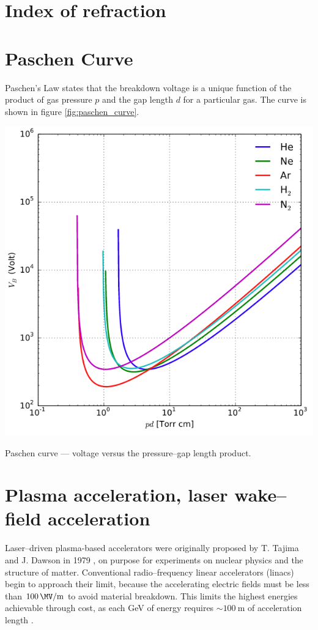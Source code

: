 \documentclass[justified,nofonts,nobib,openany]{tufte-book}
\begin{document}
\section{Index of refraction}\label{sec:indexrefraction}


\section{Paschen Curve}\label{sec:paschen}
Paschen's Law states that the breakdown voltage is a unique function of the product of gas pressure $p$ and the gap length $d$ for a particular gas. The curve is shown in figure \ref{fig:paschen_curve}.
\begin{marginfigure}
    \includegraphics[width=\marginparwidth]{figures/paschen_curve.PNG}
    \label{fig:paschen_curve}
    \caption{Paschen curve --- voltage versus the pressure--gap length product.}
\end{marginfigure}

\section{Plasma acceleration, laser wake--field acceleration}\label{sec:wakefield}
Laser--driven plasma-based accelerators were originally proposed by T. Tajima and J. Dawson in 1979 \cite{Dawson1979}, on purpose for experiments on nuclear physics and the structure of matter. Conventional radio--frequency linear accelerators (linacs) begin to approach their limit, because the accelerating electric fields  must  be  less  than  $\SI{100}{\MV\per \m}$  to  avoid material breakdown. This limits the highest energies achievable through cost, as each \si{\GeV} of energy requires $\sim \SI{100}{\m}$ of acceleration length \cite{Esarey2009PhysicsAccelerators}.
\end{document}
